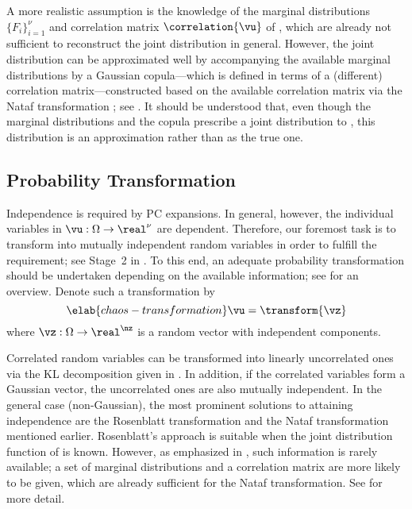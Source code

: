 A more realistic assumption is the knowledge of the marginal distributions $\{
F_i \}_{i = 1}^\nu$ and correlation matrix $\correlation{\vu}$ of \vu, which are
already not sufficient to reconstruct the joint distribution in general.
However, the joint distribution can be approximated well by accompanying the
available marginal distributions by a Gaussian copula---which is defined in
terms of a (different) correlation matrix---constructed based on the available
correlation matrix via the Nataf transformation \cite{liu1986}; see
. It should be understood that, even though the
marginal distributions and the copula prescribe a joint distribution to \vu,
this distribution is an approximation rather than as the true one.

\subsection{Probability Transformation}

Independence is required by \ac{PC} expansions. In general, however, the \nu
individual variables in $\vu: \Omega \to \real^\nu$ are dependent. Therefore,
our foremost task is to transform \vu into mutually independent random variables
in order to fulfill the requirement; see Stage~2 in . To
this end, an adequate probability transformation should be undertaken depending
on the available information; see \cite{eldred2008} for an overview. Denote such
a transformation by
\begin{equation} \elab{chaos-transformation}
  \vu = \transform{\vz}
\end{equation}
where $\vz: \Omega \to \real^\nz$ is a random vector with \nz independent
components.

Correlated random variables can be transformed into linearly uncorrelated ones
via the \ac{KL} decomposition given in . In addition, if
the correlated variables form a Gaussian vector, the uncorrelated ones are also
mutually independent. In the general case (non-Gaussian), the most prominent
solutions to attaining independence are the Rosenblatt transformation
\cite{rosenblatt1952} and the Nataf transformation mentioned earlier.
Rosenblatt's approach is suitable when the joint distribution function of \vu is
known. However, as emphasized in , such information is
rarely available; a set of marginal distributions and a correlation matrix are
more likely to be given, which are already sufficient for the Nataf
transformation. See  for more detail.

